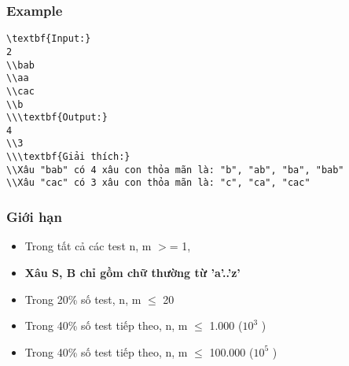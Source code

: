\subsubsection{   Example  }
\begin{verbatim}
\textbf{Input:}
2
\\bab
\\aa
\\cac
\\b
\\\textbf{Output:}
4
\\3
\\\textbf{Giải thích:}
\\Xâu "bab" có 4 xâu con thỏa mãn là: "b", "ab", "ba", "bab"
\\Xâu "cac" có 3 xâu con thỏa mãn là: "c", "ca", "cac" \end{verbatim}

\subsubsection{   Giới hạn  }
\begin{itemize}
	\item     Trong tất cả các test n, m $>$= 1,   
	\item \textbf{     Xâu S, B chỉ gồm chữ thường từ 'a'..'z'    }
	\item     Trong 20\% số test, n, m  $\le$  20   
	\item     Trong 40\% số test tiếp theo, n, m  $\le$  1.000 ($10^{3}$    )   
	\item     Trong 40\% số test tiếp theo, n, m  $\le$  100.000 ($10^{5}$    )   
\end{itemize}
